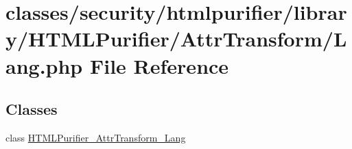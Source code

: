 \hypertarget{AttrTransform_2Lang_8php}{\section{classes/security/htmlpurifier/library/\+H\+T\+M\+L\+Purifier/\+Attr\+Transform/\+Lang.php File Reference}
\label{AttrTransform_2Lang_8php}
}
\subsection*{Classes}
\begin{DoxyCompactItemize}
\item 
class \hyperlink{classHTMLPurifier__AttrTransform__Lang}{H\+T\+M\+L\+Purifier\+\_\+\+Attr\+Transform\+\_\+\+Lang}
\end{DoxyCompactItemize}

